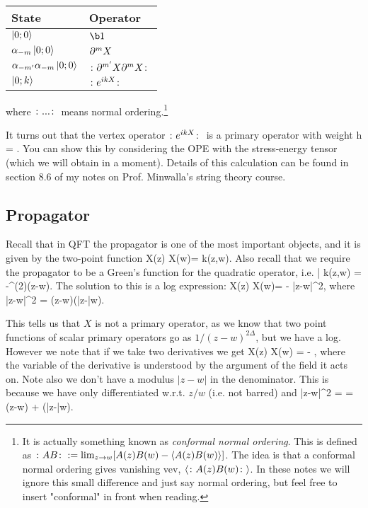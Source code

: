 \begin{center}
	\begin{tabular}{@{} C{5cm} C{5cm} @{}}
		\toprule
		State & Operator  \\
		\midrule 
		$\ket{0;0}$ & $\b1$ \\
		$\alpha_{-m}\ket{0;0}$ & $\partial^m X$ \\
		$\alpha_{-m^{\prime}}\alpha_{-m}\ket{0;0}$ & $\colon \partial^{m^{\prime}}X\partial^m X \colon$ \\
		$\ket{0;k}$ & $\colon e^{ikX} \colon $ \\
		\bottomrule
	\end{tabular}
\end{center}
where $\colon ... \colon$ means normal ordering.\footnote{It is actually something known as \textit{conformal normal ordering}. This is defined as $\colon A B \colon := \lim_{z\to w} [A(z)B(w)- \langle A(z) B(w)\rangle ]$. The idea is that a conformal normal ordering gives vanishing vev, $\langle \colon A(z)B(w) \colon \rangle$. In these notes we will ignore this small difference and just say normal ordering, but feel free to insert "conformal" in front when reading.}

\badr 
    It turns out that the vertex operator $\colon e^{ikX} \colon$ is a primary operator with weight 
    \bse 
        h = .
    \ese 
    You can show this by considering the OPE with the stress-energy tensor (which we will obtain in a moment). Details of this calculation can be found in section 8.6 of my notes on Prof. Minwalla's string theory course. 
\eadr 

\subsection{Propagator}

Recall that in QFT the propagator is one of the most important objects, and it is given by the two-point function
\bse 
    \la X(z) X(w)\ra = k(z,w).
\ese 
Also recall that we require the propagator to be a Green's function for the quadratic operator, i.e.
\bse 
    \p \bar{\p} k(z,w) = -\del^{(2)}(z-w).
\ese 
The solution to this is a log expression:
\bse 
    \la X(z) X(w)\ra = - \log |z-w|^2,
\ese
where 
\bse 
    |z-w|^2 = (z-w)(\bar{z}-\bar{w}).
\ese 

This tells us that $X$ is not a primary operator, as we know that two point functions of scalar primary operators go as $1/(z-w)^{2\Delta}$, but we have a log. However we note that if we take two derivatives we get 
\bse 
    \la \p X(z) \p X(w) \ra = - ,
\ese 
where the variable of the derivative is understood by the argument of the field it acts on. Note also we don't have a modulus $|z-w|$ in the denominator. This is because we have only differentiated w.r.t. $z/w$ (i.e. not barred) and 
\bse 
    \log|z-w|^2 = \log{} = \log(z-w) + \log(\bar{z}-\bar{w}).
\ese 


